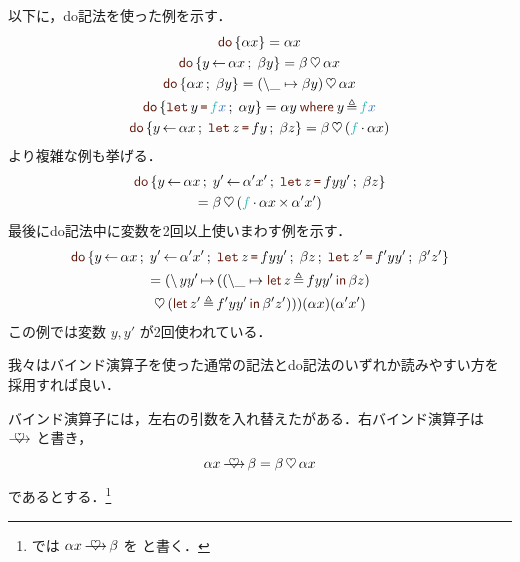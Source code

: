 \documentclass[a5paper,twoside,fleqn,draft]{jsbook}
\begin{document}
以下に，do記法を使った例を示す．
\begin{gather}
\mDo{\alpha x}=\alpha x\\
\mDo{y\mDoEq\alpha x\mDoNext\beta y}=\beta\mBind\alpha x\\
\mDo{\alpha x\mDoNext\beta y}=(\hLambdaSyntax{\_}{\beta y})\mBind \alpha x\label{eq:do-alpha-beta}\\
\mDo{\mDoLet{y}{\hFunc{f}\hVar{x}}\mDoNext\alpha y}=\alpha y\mWhereIsEXP{y}{\hFunc{f}\hVar{x}}\\
\mDo{y\mDoEq\alpha x\mDoNext\mDoLet{z}{fy}\mDoNext\beta z}
=\beta\mBind{}(\hFunc{f}\mMap\alpha x)
\end{gather}
より複雑な例も挙げる．
\begin{multline}
\mDo{y\mDoEq\alpha x\mDoNext y'\mDoEq\alpha'x'\mDoNext\mDoLet{z}{fyy'}
\mDoNext\beta z}\\
=\beta\mBind{}(\hFunc{f}\mMap\alpha x\mAppMap\alpha'x')
\end{multline}
最後にdo記法中に変数を2回以上使いまわす例を示す．
\begin{multline}
\mDo{y\mDoEq\alpha x\mDoNext y'\mDoEq\alpha'x'\mDoNext\mDoLet{z}{fyy'}\mDoNext\beta z\mDoNext\mDoLet{z'}{f'yy'}\mDoNext\beta'z'}\\
=(\mLambda yy'\mLambdaArrow{}((\hLambdaSyntax{\_}{\mLetInEXP{z}{fyy'}{\beta z}})\\
\mBind{}(\mLetInEXP{z'}{f'yy'}{\beta'z'}))) (\alpha x)(\alpha'x')
\end{multline}
この例では変数 $y,y'$ が2回使われている．


我々はバインド演算子を使った通常の記法とdo記法のいずれか読みやすい方を採用すれば良い．



\separator

バインド演算子には，左右の引数を入れ替えたがある．右バインド演算子は $\mBindRight$ と書き，
\begin{equation}
\alpha x\mBindRight\beta=\beta\mBind\alpha x
\end{equation}
であるとする．\footnote{\haskell では $\alpha x\mBindRight\beta$ を  と書く．}
\end{document}
